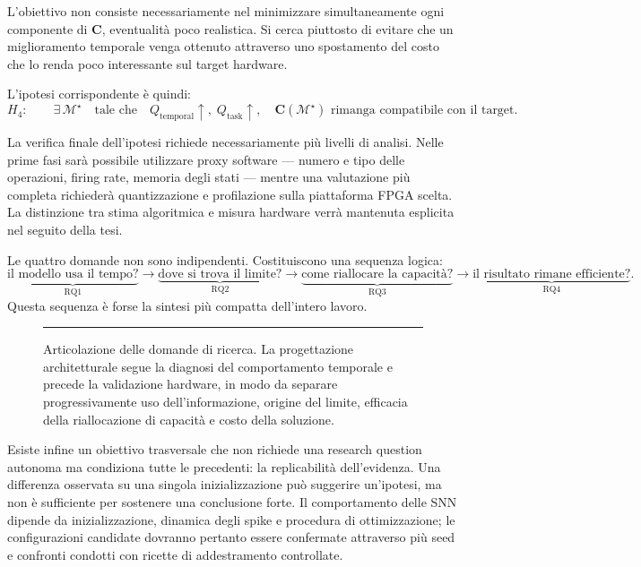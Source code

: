 L'obiettivo non consiste necessariamente nel minimizzare simultaneamente ogni componente di $\mathbf{C}$, eventualità poco realistica. Si cerca piuttosto di evitare che un miglioramento temporale venga ottenuto attraverso uno spostamento del costo che lo renda poco interessante sul target hardware.

L'ipotesi corrispondente è quindi:
\begin{equation}
\label{eq:h4}
H_4: \qquad \exists\,\mathcal{M}^\star \quad \text{tale che} \quad Q_{\mathrm{temporal}}\uparrow,\; Q_{\mathrm{task}}\uparrow, \quad \mathbf{C}(\mathcal{M}^\star) \text{ rimanga compatibile con il target}.
\end{equation}

La verifica finale dell'ipotesi richiede necessariamente più livelli di analisi. Nelle prime fasi sarà possibile utilizzare proxy software --- numero e tipo delle operazioni, firing rate, memoria degli stati --- mentre una valutazione più completa richiederà quantizzazione e profilazione sulla piattaforma FPGA scelta. La distinzione tra stima algoritmica e misura hardware verrà mantenuta esplicita nel seguito della tesi.

Le quattro domande non sono indipendenti. Costituiscono una sequenza logica:
\begin{equation}
\label{eq:catena_rq}
\underbrace{\text{il modello usa il tempo?}}_{\mathrm{RQ1}} \longrightarrow \underbrace{\text{dove si trova il limite?}}_{\mathrm{RQ2}} \longrightarrow \underbrace{\text{come riallocare la capacità?}}_{\mathrm{RQ3}} \longrightarrow \underbrace{\text{il risultato rimane efficiente?}}_{\mathrm{RQ4}}.
\end{equation}
Questa sequenza è forse la sintesi più compatta dell'intero lavoro.

\begin{figure}[htbp]
    \centering
    \rule{0.9\textwidth}{4.5cm} %
    \caption{Articolazione delle domande di ricerca. La progettazione architetturale segue la diagnosi del comportamento temporale e precede la validazione hardware, in modo da separare progressivamente uso dell'informazione, origine del limite, efficacia della riallocazione di capacità e costo della soluzione.}
    \label{fig:articolazione_rq}
\end{figure}

Esiste infine un obiettivo trasversale che non richiede una research question autonoma ma condiziona tutte le precedenti: la replicabilità dell'evidenza. Una differenza osservata su una singola inizializzazione può suggerire un'ipotesi, ma non è sufficiente per sostenere una conclusione forte. Il comportamento delle SNN dipende da inizializzazione, dinamica degli spike e procedura di ottimizzazione; le configurazioni candidate dovranno pertanto essere confermate attraverso più seed e confronti condotti con ricette di addestramento controllate.

